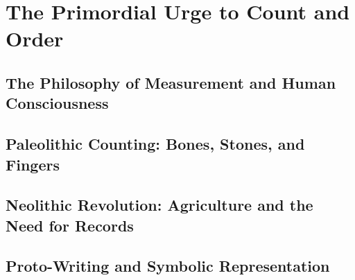 
\chapter{The Primordial Urge to Count and Order}
\section{The Philosophy of Measurement and Human Consciousness}

\section{Paleolithic Counting: Bones, Stones, and Fingers}

\section{Neolithic Revolution: Agriculture and the Need for Records}

\section{Proto-Writing and Symbolic Representation}

